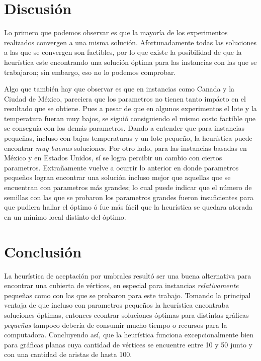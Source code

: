 \documentclass{article}
\newcommand{\tit}[1]{\textit{#1}}
\begin{document}
  \section{Discusión} \label{discussion}

  Lo primero que podemos observar es que la mayoría de los experimentos realizados
  convergen a una misma solución. Afortunadamente todas las soluciones a las que se 
  convergen son factibles, por lo que existe la posibilidad de que la heurística este
  encontrando una solución óptima para las instancias con las que se trabajaron;
  sin embargo, eso no lo podemos comprobar. 

  Algo que también hay que observar es que en instancias como Canada y la Ciudad de 
  México, pareciera que los parametros no tienen tanto impácto en el resultado que 
  se obtiene. Pues a pesar de que en algunos experimentos el lote y la temperatura 
  fueran muy bajos, se siguió consiguiendo el mismo costo factible que se conseguía
  con los demás parametros. Dando a entender que para instancias pequeñas, incluso
  con bajas temperaturas y un lote pequeño, la heurística puede encontrar \tit{muy 
  buenas} soluciones. Por otro lado, para las instancias basadas en México y en 
  Estados Unidos, sí se logra percibir un cambio con ciertos parametros. 
  Extrañamente vuelve a ocurrir lo anterior en donde parametros pequeños logran 
  encontrar una solución incluso mejor que aquellas que se encuentran con parametros
  más grandes; lo cual puede indicar que el número de semillas con las que se probaron
  los parametros grandes fueron insuficientes para que pudiera hallar el óptimo ó 
  fue más fácil que la heurística se quedara atorada en un mínimo local distinto 
  del óptimo. 

  \section{Conclusión} \label{conclussion}

  La heurística de aceptación por umbrales resultó ser una buena alternativa 
  para encontrar una cubierta de vértices, en especial para instancias 
  \tit{relativamente} pequeñas como con las que se probaron para este trabajo.
  Tomando la principal ventaja de que incluso con parametros pequeños la heurística
  encontraba soluciones óptimas, entonces econtrar soluciones óptimas para distintas
  gráficas \tit{pequeñas} tampoco debería de consumir mucho tiempo o recursos para 
  la computadora. Concluyendo así, que la heurística funciona excepcionalmente 
  bien para gráficas planas cuya cantidad de vértices se encuentre entre 
  10 y 50 junto y con una cantidad de aristas de hasta 100.
\end{document}
